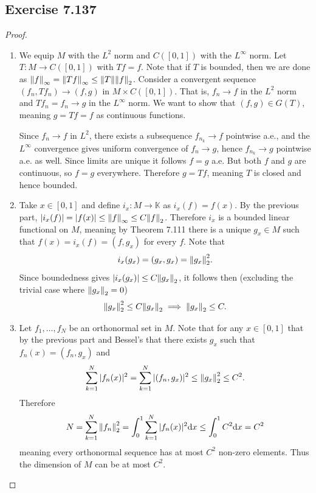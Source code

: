 \documentclass[hw_all.tex]{subfiles}
\begin{document}
\subsection{Exercise 7.137}
\begin{proof}
    \begin{enumerate}
        \item
            We equip $M$ with the $L^2$ norm and $C([0,1])$ with the $L^\infty$ norm. Let $T : M \to C([0,1])$ with $Tf = f$. Note that if $T$ is bounded, then we are done as $\norm{f}_{\infty} = \norm{Tf}_{\infty} \leq \norm{T} \norm{f}_{2}$. Consider a convergent sequence $(f_n, Tf_n) \to (f, g)$ in $M \times C([0,1])$. That is, $f_n \to f$ in the $L^2$ norm and $Tf_n = f_n \to g$ in the $L^\infty$ norm. We want to show that $(f,g) \in G(T)$, meaning $g = Tf = f$ as continuous functions.

            Since $f_n \to f$ in $L^2$, there exists a subsequence $f_{n_k} \to f$ pointwise a.e., and the $L^\infty$ convergence gives uniform convergence of $f_n \to g$, hence $f_{n_k} \to g$ pointwise a.e. as well. Since limits are unique it follows $f = g$ a.e. But both $f$ and $g$ are continuous, so $f = g$ everywhere. Therefore $g = Tf$, meaning $T$ is closed and hence bounded.

        \item 
            Take $x \in [0,1]$ and define $i_x : M \to \mathbb{K}$ as $i_x(f) = f(x)$. By the previous part, $|i_x(f)| = |f(x)| \leq \norm{f}_{\infty} \leq C \norm{f}_2$. Therefore $i_x$ is a bounded linear functional on $M$, meaning by Theorem 7.111 there is a unique $g_x \in M$ such that $f(x) = i_x(f) = (f, g_x)$ for every $f$. Note that
            \[
                i_x(g_x) = (g_x, g_x) = \norm{g_x}_2^2
            .\]
            Since boundedness gives $|i_x(g_x)| \leq C \norm{g_x}_2$, it follows then (excluding the trivial case where $\norm{g_x}_2 = 0$)
            \[
                \norm{g_x}_2^2 \leq C \norm{g_x}_2 \implies \norm{g_x}_2 \leq C
            .\]

        \item 
            Let $f_1, \ldots, f_N$ be an orthonormal set in $M$. Note that for any $x \in [0,1]$ that by the previous part and Bessel's that there exists $g_x$ such that $f_n(x) = (f_n, g_x)$ and
            \[
                \sum_{k = 1}^N |f_n(x)|^2 = \sum_{k = 1}^N |(f_n, g_x)|^2 \leq \norm{g_x}_2^2 \leq C^2
            .\]
            Therefore
            \[
                N = \sum_{k = 1}^N \norm{f_n}_2^2 = \int_0^1 \sum_{k=1}^N |f_n(x)|^2 \dd x \leq \int_0^1 C^2 \dd x = C^2
            \]
            meaning every orthonormal sequence has at most $C^2$ non-zero elements. Thus the dimension of $M$ can be at most $C^2$.
    \end{enumerate}
\end{proof}
\end{document}
